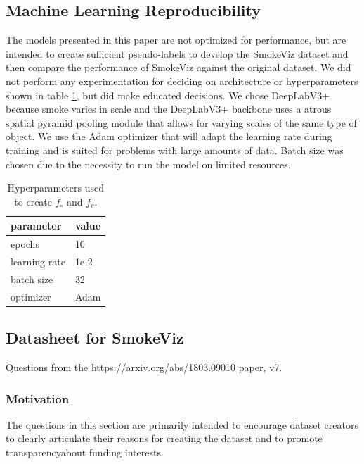 \documentclass{article}
\begin{document}
\subsection{Machine Learning Reproducibility}

The models presented in this paper are not optimized for performance, but are intended to create sufficient pseudo-labels to develop the SmokeViz dataset and then compare the performance of SmokeViz against the original dataset. We did not perform any experimentation for deciding on architecture or hyperparameters shown in table \ref{hyper}, but did make educated decisions. We chose DeepLabV3+ because smoke varies in scale and the DeepLabV3+ backbone uses a atrous spatial pyramid pooling module that allows for varying scales of the same type of object. We use the Adam optimizer that will adapt the learning rate during training and is suited for problems with large amounts of data. Batch size was chosen due to the necessity to run the model on limited resources. 

\begin{table}
    \caption{Hyperparameters used to create \(f_{\circ}\) and \(f_{c}\).}
  \label{hyper}
  \centering
  \begin{tabular}{ll}
    \toprule
    parameter & value \\ 
    \midrule
    epochs & 10 \\
    learning rate & 1e-2 \\
    batch size & 32 \\
    optimizer & Adam \\
    \bottomrule
  \end{tabular}
\end{table}



\subsection{Datasheet for SmokeViz}

Questions from the https://arxiv.org/abs/1803.09010 paper, v7.

\subsubsection{Motivation}

The questions in this section are primarily intended to encourage dataset creators to clearly articulate their reasons for creating the dataset and to promote transparencyabout funding interests.
\end{document}

